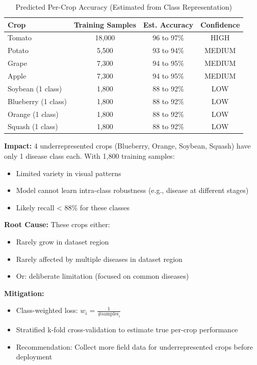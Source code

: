 \documentclass[11pt,a4paper]{article}
\begin{document}
\begin{table}[H]
\centering
\caption{Predicted Per-Crop Accuracy (Estimated from Class Representation)}
\label{tab:crop_accuracy}
\begin{tabularx}{\textwidth}{l c c c}
\toprule
\rowcolor{primarynavy}
\color{white}\textbf{Crop} & \color{white}\textbf{Training Samples} & \color{white}\textbf{Est. Accuracy} & \color{white}\textbf{Confidence} \\
\midrule
Tomato & 18,000 & 96 to 97\% & HIGH \\
\rowcolor{iceblue}
Potato & 5,500 & 93 to 94\% & MEDIUM \\
Grape & 7,300 & 94 to 95\% & MEDIUM \\
\rowcolor{iceblue}
Apple & 7,300 & 94 to 95\% & MEDIUM \\
Soybean (1 class) & 1,800 & 88 to 92\% & LOW \\
\rowcolor{iceblue}
Blueberry (1 class) & 1,800 & 88 to 92\% & LOW \\
Orange (1 class) & 1,800 & 88 to 92\% & LOW \\
\rowcolor{iceblue}
Squash (1 class) & 1,800 & 88 to 92\% & LOW \\
\bottomrule
\end{tabularx}
\end{table}

\textbf{Impact:} 4 underrepresented crops (Blueberry, Orange, Soybean, Squash) have only 1 disease class each. With 1,800 training samples:
\begin{itemize}
  \item Limited variety in visual patterns
  \item Model cannot learn intra-class robustness (e.g., disease at different stages)
  \item Likely recall < 88\% for these classes
\end{itemize}

\textbf{Root Cause:} These crops either:
\begin{itemize}
  \item Rarely grow in dataset region
  \item Rarely affected by multiple diseases in dataset region
  \item Or: deliberate limitation (focused on common diseases)
\end{itemize}

\textbf{Mitigation:}
\begin{itemize}
  \item Class-weighted loss: $w_i = \frac{1}{\text{\# samples}_i}$
  \item Stratified k-fold cross-validation to estimate true per-crop performance
  \item Recommendation: Collect more field data for underrepresented crops before deployment
\end{itemize}
\end{document}
